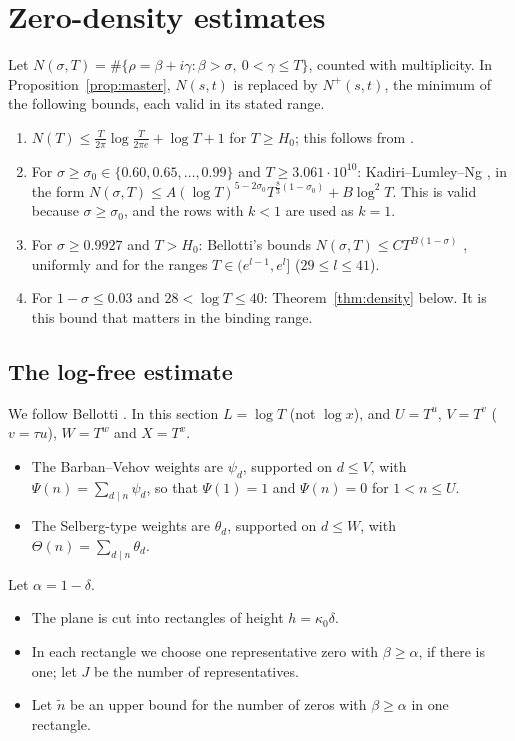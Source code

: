 \section{Zero-density estimates}\label{sec:density}

Let $N(\sigma,T) = \#\{\rho = \beta+i\gamma: \beta > \sigma,\ 0 < \gamma \le T\}$, counted with multiplicity.
In Proposition~\ref{prop:master}, $N(s,t)$ is replaced by $N^+(s,t)$, the minimum of the following bounds, each valid in its stated range.
\begin{enumerate}
\item[(N1)] $N(T) \le \frac T{2\pi}\log\frac T{2\pi e} + \log T + 1$ for $T \ge H_0$; this follows from \cite{HSW}.
\item[(N2)] For $\sigma \ge \sigma_0 \in\{0.60, 0.65, \dots, 0.99\}$ and $T \ge 3.061\cdot 10^{10}$: Kadiri--Lumley--Ng \cite[Table~1]{KLN}, in the form $N(\sigma,T) \le A(\log T)^{5-2\sigma_0}T^{\frac83(1-\sigma_0)} + B\log^2T$.
  This is valid because $\sigma \ge \sigma_0$, and the rows with $k < 1$ are used as $k = 1$.
\item[(N3)] For $\sigma \ge 0.9927$ and $T > H_0$: Bellotti's bounds $N(\sigma,T) \le CT^{B(1-\sigma)}$ \cite[Thm.~1.1, Table~2]{Bellotti}, uniformly and for the ranges $T\in(e^{l-1},e^l]$ ($29\le l\le41$).
\item[(N4)] For $1-\sigma \le 0.03$ and $28 < \log T \le 40$: Theorem~\ref{thm:density} below.
  It is this bound that matters in the binding range.
\end{enumerate}

\subsection{The log-free estimate}
We follow Bellotti \cite[\S\S3--4]{Bellotti}. In this section $L = \log T$ (not $\log x$), and $U = T^u$, $V = T^v$ ($v = \tau u$), $W = T^w$ and $X = T^x$.
\begin{itemize}
\item The Barban--Vehov weights are $\psi_d$, supported on $d\le V$, with $\Psi(n) = \sum_{d\mid n}\psi_d$, so that $\Psi(1) = 1$ and $\Psi(n) = 0$ for $1 < n \le U$.
\item The Selberg-type weights are $\theta_d$, supported on $d\le W$, with $\Theta(n) = \sum_{d\mid n}\theta_d$.
\end{itemize}
Let $\alpha = 1-\delta$.
\begin{itemize}
\item The plane is cut into rectangles of height $h = \kappa_0\delta$.
\item In each rectangle we choose one representative zero with $\beta \ge \alpha$, if there is one; let $J$ be the number of representatives.
\item Let $\tilde n$ be an upper bound for the number of zeros with $\beta\ge\alpha$ in one rectangle.
\end{itemize}

